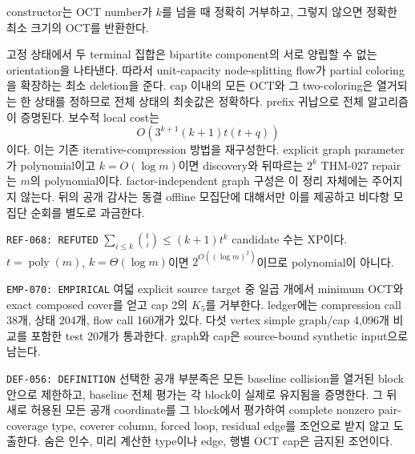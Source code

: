 \documentclass[11pt]{article}
\begin{document}
{}
constructor는 OCT number가 \(k\)를 넘을 때 정확히 거부하고, 그렇지
않으면 정확한 최소 크기의 OCT를 반환한다.
\begin{claimproof}
고정 상태에서 두 terminal 집합은 bipartite component의 서로 양립할
수 없는 orientation을 나타낸다. 따라서 unit-capacity node-splitting
flow가 partial coloring을 확장하는 최소 deletion을 준다. cap 이내의
모든 OCT와 그 two-coloring은 열거되는 한 상태를 정하므로 전체 상태의
최솟값은 정확하다. prefix 귀납으로 전체 알고리즘이 증명된다. 보수적
local cost는
\[
 O\!\left(3^{k+1}(k+1)t(t+q)\right)
\]
이다. 이는 기존 iterative-compression 방법을 재구성한다. explicit
graph parameter가 polynomial이고 \(k=O(\log m)\)이면 discovery와
뒤따르는 \(2^k\) THM-027
repair는 \(m\)의 polynomial이다. factor-independent graph 구성은
이 정리 자체에는 주어지지 않는다. 뒤의 공개 감사는 동결 offline
모집단에 대해서만 이를 제공하고 비다항 모집단 순회를 별도로 과금한다.
\end{claimproof}

{\texttt{REF-068: REFUTED}}
\(\sum_{i\le k}\binom{t}{i}\le(k+1)t^k\) candidate 수는 XP이다.
\(t=\operatorname{poly}(m)\), \(k=\Theta(\log m)\)이면
\(2^{O((\log m)^2)}\)이므로 polynomial이 아니다.

{\texttt{EMP-070: EMPIRICAL}}
여덟 explicit source target 중 일곱 개에서 minimum OCT와 exact composed
cover를 얻고 cap 2의 \(K_5\)를 거부한다. ledger에는 compression call
38개, 상태 204개, flow call 160개가 있다. 다섯 vertex simple
graph/cap 4,096개 비교를 포함한 test 20개가 통과한다. graph와 cap은
source-bound synthetic input으로 남는다.

{\texttt{DEF-056: DEFINITION}}
선택한 공개 부분족은 모든 baseline collision을 열거된 block 안으로
제한하고, baseline 전체 평가는 각 block이 실제로 유지됨을 증명한다.
그 뒤 새로 허용된 모든 공개 coordinate를 그 block에서 평가하여 complete
nonzero pair-coverage type, coverer column, forced loop, residual edge를
조언으로 받지 않고 도출한다. 숨은 인수, 미리 계산한 type이나 edge,
행별 OCT cap은 금지된 조언이다.
\end{document}
